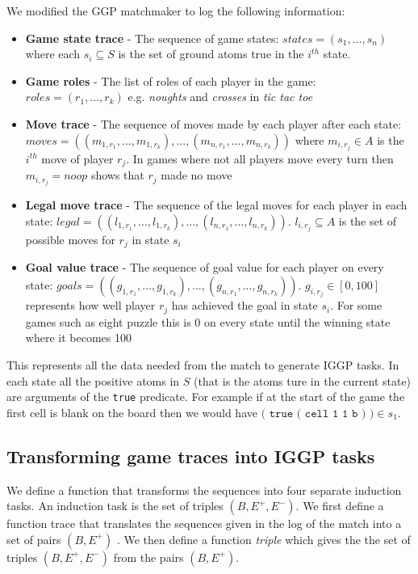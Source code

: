 We modified the GGP matchmaker to log the following information:
\begin{itemize}
	\item \textbf{Game state trace} - The sequence of game states: $states = (s_1,...,s_n)$ where each $s_i \subseteq S$ is the set of ground atoms true in the $i^{th}$ state.
	\item \textbf{Game roles} - The list of roles of each player in the game: $roles = (r_1,...,r_k)$ e.g. \textit{noughts} and \textit{crosses} in \textit{tic tac toe}
	\item \textbf{Move trace} - The sequence of moves made by each player after each state: $moves = ((m_{1,r_1},...,m_{1,r_k}),...,(m_{n,r_1},...,m_{n,r_k}))$ where $m_{i,r_j} \in A$ is the $i^{th}$ move of player $r_j$. In games where not all players move every turn then $m_{i,r_j}=noop$ shows that $r_j$ made no move
	\item \textbf{Legal move trace} - The sequence of the legal moves for each player in each state:  $legal = ((l_{1,r_1},...,l_{1,r_k}),...,(l_{n,r_1},...,l_{n,r_k}))$. $l_{i,r_j} \subseteq A$ is the set of possible moves for $r_j$ in state $s_i$
	\item \textbf{Goal value trace} - The sequence of goal value for each player on every state: $goals = ((g_{1,r_1},...,g_{1,r_k}),...,(g_{n,r_1},...,g_{n,r_k}))$. $g_{i,r_j} \in [0,100]$ represents how well player $r_j$ has achieved the goal in state $s_i$. For some games such as eight puzzle this is 0 on every state until the winning state where it becomes 100

\end{itemize}
This represents all the data needed from the match to generate IGGP tasks. In each state all the positive atoms in $S$ (that is the atoms ture in the current state) are arguments of the \texttt{true} predicate. For example if at the start of the game the first cell is blank on the board then we would have $\texttt{( true ( cell 1 1 b ) )} \in s_1$.

\subsection{Transforming game traces into IGGP tasks}

We define a function that transforms the sequences into four separate induction tasks. An induction task is the set of triples $(B,E^+,E^-)$. We first define a function trace that translates the sequences given in the log of the match into a set of pairs $(B,E^+)$ . We then define a function \textit{triple} which gives the the set of triples  $(B,E^+,E^-)$ from the pairs $(B,E^+)$.

